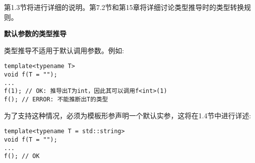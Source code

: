 第1.3节将进行详细的说明。第7.2节和第15章将详细讨论类型推导时的类型转换规则。

\noindent
\textbf{默认参数的类型推导}

类型推导不适用于默认调用参数。例如:

\begin{lstlisting}[style=styleCXX]
template<typename T>
void f(T = "");
...
f(1); // OK: 推导出T为int，因此其可以调用f<int>(1)
f(); // ERROR: 不能推断出T的类型
\end{lstlisting}

为了支持这种情况，必须为模板形参声明一个默认实参，这将在1.4节中进行详述:

\begin{lstlisting}[style=styleCXX]
template<typename T = std::string>
void f(T = "");
...
f(); // OK
\end{lstlisting}














